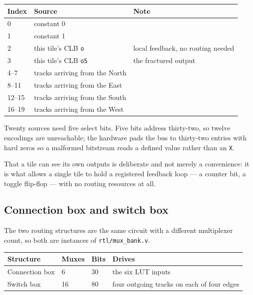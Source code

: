 \documentclass[11pt,a4paper]{article}
\newcommand{\file}[1]{\texttt{#1}}
\newcommand{\sig}[1]{\texttt{#1}}
\begin{document}
\begin{center}
\begin{tabular}{lll}
\toprule
\textbf{Index} & \textbf{Source} & \textbf{Note} \\
\midrule
0     & constant 0            & \\
1     & constant 1            & \\
2     & this tile's CLB \sig{o}   & local feedback, no routing needed \\
3     & this tile's CLB \sig{o5}  & the fractured output \\
4--7  & tracks arriving from the North & \\
8--11 & tracks arriving from the East  & \\
12--15& tracks arriving from the South & \\
16--19& tracks arriving from the West  & \\
\bottomrule
\end{tabular}
\end{center}

Twenty sources need five select bits. Five bits address thirty-two, so twelve
encodings are unreachable; the hardware pads the bus to thirty-two entries with
hard zeros so a malformed bitstream reads a defined value rather than an
\texttt{X}.

That a tile can see its own outputs is deliberate and not merely a convenience:
it is what allows a single tile to hold a registered feedback loop --- a counter
bit, a toggle flip-flop --- with no routing resources at all.

\subsection{Connection box and switch box}

The two routing structures are the same circuit with a different multiplexer
count, so both are instances of \file{rtl/mux\_bank.v}.

\begin{center}
\begin{tabular}{llll}
\toprule
\textbf{Structure} & \textbf{Muxes} & \textbf{Bits} & \textbf{Drives} \\
\midrule
Connection box & 6  & 30 & the six LUT inputs \\
Switch box     & 16 & 80 & four outgoing tracks on each of four edges \\
\bottomrule
\end{tabular}
\end{center}
\end{document}
